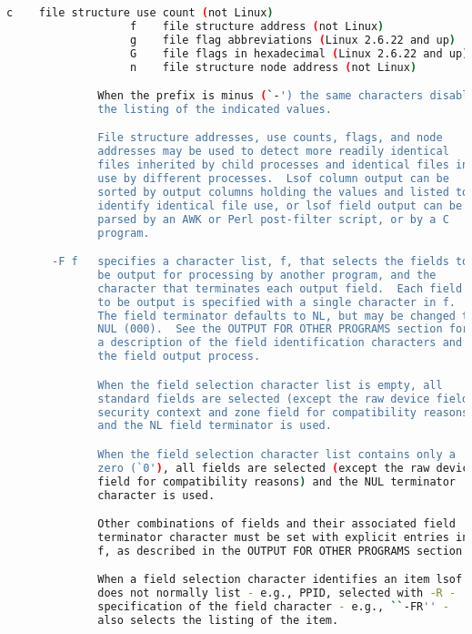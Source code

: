 {{\begin{lstlisting}[language=bash]
                   c    file structure use count (not Linux)
                   f    file structure address (not Linux)
                   g    file flag abbreviations (Linux 2.6.22 and up)
                   G    file flags in hexadecimal (Linux 2.6.22 and up)
                   n    file structure node address (not Linux)

              When the prefix is minus (`-') the same characters disable
              the listing of the indicated values.

              File structure addresses, use counts, flags, and node
              addresses may be used to detect more readily identical
              files inherited by child processes and identical files in
              use by different processes.  Lsof column output can be
              sorted by output columns holding the values and listed to
              identify identical file use, or lsof field output can be
              parsed by an AWK or Perl post-filter script, or by a C
              program.

       -F f   specifies a character list, f, that selects the fields to
              be output for processing by another program, and the
              character that terminates each output field.  Each field
              to be output is specified with a single character in f.
              The field terminator defaults to NL, but may be changed to
              NUL (000).  See the OUTPUT FOR OTHER PROGRAMS section for
              a description of the field identification characters and
              the field output process.

              When the field selection character list is empty, all
              standard fields are selected (except the raw device field,
              security context and zone field for compatibility reasons)
              and the NL field terminator is used.

              When the field selection character list contains only a
              zero (`0'), all fields are selected (except the raw device
              field for compatibility reasons) and the NUL terminator
              character is used.

              Other combinations of fields and their associated field
              terminator character must be set with explicit entries in
              f, as described in the OUTPUT FOR OTHER PROGRAMS section.

              When a field selection character identifies an item lsof
              does not normally list - e.g., PPID, selected with -R -
              specification of the field character - e.g., ``-FR'' -
              also selects the listing of the item.


\end{lstlisting}}}
